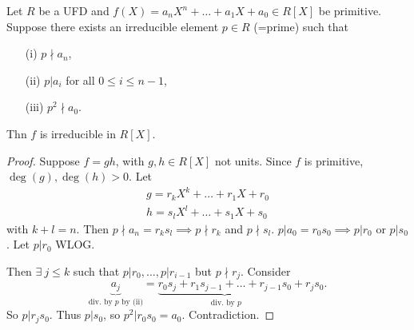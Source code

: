 \documentclass[egregdoesnotlikesansseriftitles,a4paper]{scrartcl}
\begin{document}
\begin{lemma}
       Let $R$ be a UFD and $f (X)=a_n X^{n}+\ldots+a_1 X+ a_0 \in R[X]$ be primitive. Suppose there exists an irreducible element $p \in R$ (=prime) such that 
       \begin{itemize}
             \item[(i)] $p \nmid a_n$,
             \item[(ii)] $p|a_i$ for all $0 \leq i \leq n-1$,
             \item[(iii)] $p^2 \nmid a_0 $.
       \end{itemize}
       Thn $f$ is irreducible in $R[X]$.
       \begin{proof}
              Suppose $f=gh$, with $g,h \in R[X]$ not units. Since $f$ is primitive, $\operatorname{deg}(g), \operatorname{deg}(h)>0$. Let 
              \begin{align*}
                    g=r_k X^{k}+\ldots+r_1 X+r_0 \\
                    h=s_l X^{l}+\ldots+s_1 X+ s_0 
              \end{align*}
              with $k+l=n$. Then $p \nmid a_n=r_k s_l \implies p \nmid r_k$ and $p \nmid s_l$. $p| a_0 =r_0 s_0 \implies p| r_0 $ or $p|s_0 $. Let $p|r_0 $ WLOG. 
              
              Then $\exists \ j \leq k$ such that $p|r_0 , \ldots , p|r_{i-1}$ but $p \nmid r_j$. Consider \[
              \underbrace{a_j}_{\text{div. by } p \text{ by (ii)} }  = \underbrace{r_0 s_j +r_1 s_{j-1}+\ldots +r_{j-1}s_0}_{\text{ div. by } p}  +r_j s_0 
              .\] So $p|r_js_0 $. Thus $p|s_0 $, so $p^2 |r_0 s_0 =a_0 $. Contradiction.
       \end{proof}
\end{lemma}
\end{document}

